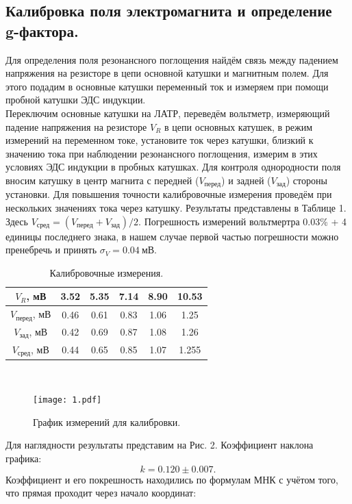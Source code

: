 \documentclass[a4paper,12pt]{article}
\begin{document}
\subsection*{Калибровка поля электромагнита и определение g-фактора.}
Для определения поля резонансного поглощения найдём связь между падением напряжения на резисторе в цепи основной катушки и магнитным полем. Для этого подадим в основные катушки переменный ток и измеряем при помощи пробной катушки
ЭДС индукции. \\
Переключим основные катушки на ЛАТР, переведём вольтметр, измеряющий
падение напряжения на резисторе $V_R$ в цепи основных катушек, в режим измерений на
переменном токе, установите ток через катушки, близкий к значению тока при наблюдении резонансного поглощения, измерим в этих условиях ЭДС индукции в пробных катушках. Для контроля однородности поля вносим катушку в центр магнита с передней ($V_{\text{перед}}$) и задней ($V_{\text{зад}}$)
стороны установки. Для повышения точности калибровочные измерения проведём при нескольких значениях тока через катушку. Результаты представлены в Таблице 1. Здесь $V_{\text{сред}} = \left( V_{\text{перед}} + V_{\text{зад}}\right)/2$. Погрешность измерений вольтмертра 0.03\% + 4 единицы последнего знака, в нашем случае первой частью погрешности можно пренебречь и принять $\sigma_V = 0.04~\text{мВ}$.
\begin{table}[h]
\begin{tabular}{|c|c|c|c|c|c|}
\hline
$V_R$, мВ              & 3.52 & 5.35 & 7.14 & 8.90 & 10.53 \\ \hline
$V_{\text{перед}}$, мВ & 0.46 & 0.61 & 0.83 & 1.06 & 1.25  \\ \hline
$V_{\text{зад}}$, мВ   & 0.42 & 0.69 & 0.87 & 1.08 & 1.26  \\ \hline
$V_{\text{сред}}$, мВ  & 0.44 & 0.65 & 0.85 & 1.07 & 1.255 \\ \hline
\end{tabular}
\centering
\caption{Калибровочные измерения.}
\end{table}\\
\begin{figure}
\vspace{-1cm}
\texttt{[image: 1.pdf]}
\centering
\caption{График измерений для калибровки.}
\end{figure}
Для наглядности результаты представим на Рис. 2. Коэффициент наклона графика:
\[k = 0.120\pm 0.007.\]
Коэффициент и его покрешность находились по формулам МНК с учётом того, что прямая проходит через начало координат:
\end{document}
